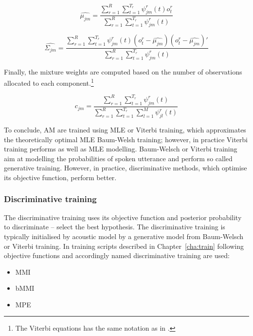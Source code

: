 {\begin{equation}\label{eq:mean}
    \hat{\mu_{jm}} = \frac{\sum_{r=1}^{R}{\sum_{t=1}^{T_r}{\psi^r_{jm}(t)o^r_t}}}  {\sum_{r=1}^{R}{\sum_{t=1}^{T_r}{\psi^r_{jm}(t)}}}
\end{equation}

\begin{equation}\label{eq:var}
    \hat{\Sigma_{jm}} = \frac{\sum_{r=1}^{R}{\sum_{t=1}^{T_r}{\psi^r_{jm}(t)(o^r_t - \hat{\mu_{jm}})(o^r_t - \hat{\mu_{jm}})'}}}  {\sum_{r=1}^{R}{\sum_{t=1}^{T_r}{\psi^r_{jm}(t)}}}
\end{equation}

Finally, the mixture weights are computed based on the number of observations allocated to each component.\footnote{The Viterbi equations has the same notation as in \cite{buthpitiya2012parallel}.}

\begin{equation}\label{eq:weights}
    c_{jm} = \frac{\sum_{r=1}^{R}{\sum_{t=1}^{T_r}{\psi^r_{jm}(t)}}} {\sum_{r=1}^{R}{\sum_{t=1}^{T_r}\sum_{l=1}^{M}{\psi^r_{jl}(t)}}}
\end{equation}


To conclude, \ac{AM} are trained using \ac{MLE} or Viterbi training, which approximates the theoretically optimal \ac{MLE} Baum-Welsh training; however, in practice Viterbi training performs as well as \ac{MLE} modelling.
Baum-Welsch or Viterbi training aim at modelling the probabilities of spoken utterance and perform so called generative training.
However, in practice, discriminative methods, which optimise its objective function, perform better.

\subsubsection*{Discriminative training}
\label{sub:subsection_name}
The discriminative training uses its objective function and posterior probability to discriminate -- select the best hypothesis.
The discriminative training is typically initialised by acoustic model by a generative model from Baum-Welsch or Viterbi training.
In training scripts described in Chapter~\ref{cha:train} following objective functions and accordingly named discriminative training are used:
\begin{itemize}
    \item \acl{MMI}\cite{chow1990maximum} 
    \item \acl{bMMI}\cite{povey2008boosted}
    \item \acl{MPE}\cite{povey2003mmi}
\end{itemize}

}
